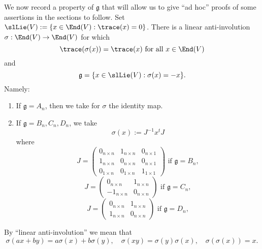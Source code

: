 \documentclass[reqno]{amsart} 
\begin{document}
We now record a property of $\mathfrak{g}$ that will allow us to give ``ad hoc'' proofs of some assertions in the sections to follow.  Set $\slLie(V) := \{x \in \End(V) : \trace(x) = 0\}$.  There is a linear anti-involution $\sigma : \End(V) \rightarrow \End(V)$ for which
\begin{equation}\label{eqn:sigma-preserves-trace}
  \trace(\sigma(x)) = \trace(x) \text{ for all } x \in \End(V)
\end{equation}
and
\begin{equation}\label{eqn:g-is-what-sigma-anti-fixes}
  \mathfrak{g}
  = \{x \in \slLie(V) : \sigma(x) = -x\}.
\end{equation}
Namely:
\begin{enumerate}
\item If $\mathfrak{g} = A_n$, then we take for $\sigma$ the identity map.
\item If $\mathfrak{g} = B_n, C_n, D_n$, we take
  \begin{equation*}
    \sigma(x) := J^{-1} x^t J
  \end{equation*}
  where
  \begin{equation*}
    J =
    \begin{pmatrix}
      0_{n \times n} & 1_{n \times n} & 0_{n \times 1} \\
      1_{n \times n} & 0_{n \times n} & 0_{n \times 1} \\
      0_{1 \times n} & 0_{1 \times n} & 1_{1 \times 1}
    \end{pmatrix}
    \text{ if } \mathfrak{g} = B_n,
  \end{equation*}
  \begin{equation*}
    J =
    \begin{pmatrix}
      0_{n \times n} & 1_{n \times n} \\
      -1_{n \times n} & 0_{n \times n}
    \end{pmatrix}
    \text{ if } \mathfrak{g} = C_n,
  \end{equation*}
  \begin{equation*}
    J =
    \begin{pmatrix}
      0_{n \times n} & 1_{n \times n} \\
      1_{n \times n} & 0_{n \times n}
    \end{pmatrix}
    \text{ if } \mathfrak{g} = D_n,
  \end{equation*}
\end{enumerate}
By ``linear anti-involution'' we mean that
\begin{equation*}
  \sigma(a x+ b y) = a \sigma(x) + b \sigma(y), \quad \sigma(x y) = \sigma(y) \sigma(x), \quad \sigma(\sigma(x)) = x.
\end{equation*}
\end{document}
